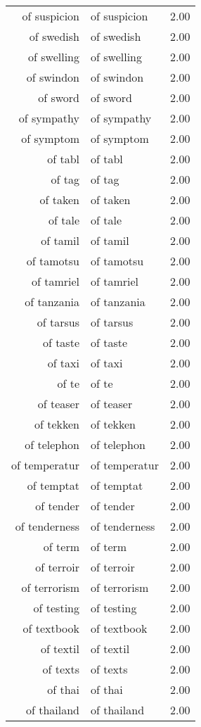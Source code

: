 \begin{table}[ht]
\begin{tabular}{rlr}
  of suspicion & of suspicion & 2.00 \\ 
  of swedish & of swedish & 2.00 \\ 
  of swelling & of swelling & 2.00 \\ 
  of swindon & of swindon & 2.00 \\ 
  of sword & of sword & 2.00 \\ 
  of sympathy & of sympathy & 2.00 \\ 
  of symptom & of symptom & 2.00 \\ 
  of tabl & of tabl & 2.00 \\ 
  of tag & of tag & 2.00 \\ 
  of taken & of taken & 2.00 \\ 
  of tale & of tale & 2.00 \\ 
  of tamil & of tamil & 2.00 \\ 
  of tamotsu & of tamotsu & 2.00 \\ 
  of tamriel & of tamriel & 2.00 \\ 
  of tanzania & of tanzania & 2.00 \\ 
  of tarsus & of tarsus & 2.00 \\ 
  of taste & of taste & 2.00 \\ 
  of taxi & of taxi & 2.00 \\ 
  of te & of te & 2.00 \\ 
  of teaser & of teaser & 2.00 \\ 
  of tekken & of tekken & 2.00 \\ 
  of telephon & of telephon & 2.00 \\ 
  of temperatur & of temperatur & 2.00 \\ 
  of temptat & of temptat & 2.00 \\ 
  of tender & of tender & 2.00 \\ 
  of tenderness & of tenderness & 2.00 \\ 
  of term & of term & 2.00 \\ 
  of terroir & of terroir & 2.00 \\ 
  of terrorism & of terrorism & 2.00 \\ 
  of testing & of testing & 2.00 \\ 
  of textbook & of textbook & 2.00 \\ 
  of textil & of textil & 2.00 \\ 
  of texts & of texts & 2.00 \\ 
  of thai & of thai & 2.00 \\ 
  of thailand & of thailand & 2.00 \\ 

\end{tabular}
\end{table}
